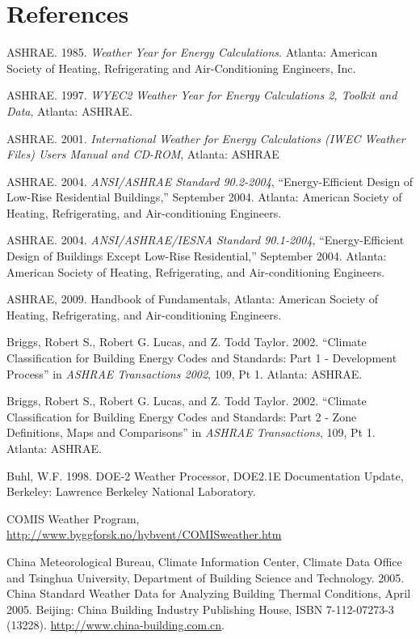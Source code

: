 \section{References}\label{references-002}

ASHRAE. 1985. \emph{Weather Year for Energy Calculations}. Atlanta: American Society of Heating, Refrigerating and Air-Conditioning Engineers, Inc.

ASHRAE. 1997. \emph{WYEC2 Weather Year for Energy Calculations 2, Toolkit and Data}, Atlanta: ASHRAE.

ASHRAE. 2001. \emph{International Weather for Energy Calculations (IWEC Weather Files) Users Manual and CD-ROM}, Atlanta: ASHRAE

ASHRAE. 2004. \emph{ANSI/ASHRAE Standard 90.2-2004}, ``Energy-Efficient Design of Low-Rise Residential Buildings,'' September 2004. Atlanta: American Society of Heating, Refrigerating, and Air-conditioning Engineers.

ASHRAE. 2004. \emph{ANSI/ASHRAE/IESNA Standard 90.1-2004}, ``Energy-Efficient Design of Buildings Except Low-Rise Residential,'' September 2004. Atlanta: American Society of Heating, Refrigerating, and Air-conditioning Engineers.

ASHRAE, 2009. Handbook of Fundamentals, Atlanta: American Society of Heating, Refrigerating, and Air-conditioning Engineers.

Briggs, Robert S., Robert G. Lucas, and Z. Todd Taylor. 2002. ``Climate Classification for Building Energy Codes and Standards: Part 1 - Development Process'' in \emph{ASHRAE Transactions 2002}, 109, Pt 1. Atlanta: ASHRAE.

Briggs, Robert S., Robert G. Lucas, and Z. Todd Taylor. 2002. ``Climate Classification for Building Energy Codes and Standards: Part 2 - Zone Definitions, Maps and Comparisons'' in \emph{ASHRAE Transactions}, 109, Pt 1. Atlanta: ASHRAE.

Buhl, W.F. 1998. DOE-2 Weather Processor, DOE2.1E Documentation Update, Berkeley: Lawrence Berkeley National Laboratory.

COMIS Weather Program, \url{http://www.byggforsk.no/hybvent/COMISweather.htm}

China Meteorological Bureau, Climate Information Center, Climate Data Office and Tsinghua University, Department of Building Science and Technology. 2005. China Standard Weather Data for Analyzing Building Thermal Conditions, April 2005. Beijing: China Building Industry Publishing House, ISBN 7-112-07273-3 (13228). \url{http://www.china-building.com.cn}.

